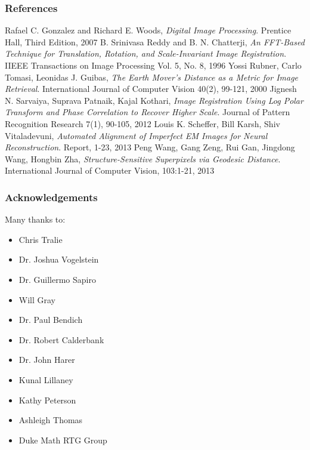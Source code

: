\documentclass{beamer}
\begin{document}
\begin{frame}
\frametitle{References}
\begin{thebibliography}{9}
\footnotesize
{}
	Rafael C. Gonzalez and Richard E. Woods,
	\emph{Digital Image Processing}.
	Prentice Hall, Third Edition, 2007
	B. Srinivasa Reddy and B. N. Chatterji,
	\emph{An FFT-Based Technique for Translation, Rotation, and Scale-Invariant Image Registration}.
	IIEEE Transactions on Image Processing Vol. 5, No. 8, 1996
	Yossi Rubner, Carlo Tomasi, Leonidas J. Guibas,
	\emph{The Earth Mover's Distance as a Metric for Image Retrieval}.
	International Journal of Computer Vision 40(2), 99-121, 2000
	Jignesh N. Sarvaiya, Suprava Patnaik, Kajal Kothari,
	\emph{Image Registration Using Log Polar Transform and Phase Correlation to Recover Higher Scale}.
	Journal of Pattern Recognition Research 7(1), 90-105, 2012
	Louis K. Scheffer, Bill Karsh, Shiv Vitaladevuni,
	\emph{Automated Alignment of Imperfect EM Images for Neural Reconstruction}.
	Report, 1-23, 2013
	Peng Wang, Gang Zeng, Rui Gan, Jingdong Wang, Hongbin Zha,
	\emph{Structure-Sensitive Superpixels via Geodesic Distance}.
	International Journal of Computer Vision, 103:1-21, 2013
\end{thebibliography} 
\end{frame}

\begin{frame}
\frametitle{Acknowledgements}
Many thanks to:
\begin{itemize}
\item Chris Tralie
\item Dr. Joshua Vogelstein
\item Dr. Guillermo Sapiro
\item Will Gray 
\item Dr. Paul Bendich 
\item Dr. Robert Calderbank
\item Dr. John Harer
\item Kunal Lillaney
\item Kathy Peterson 
\item Ashleigh Thomas 
\item Duke Math RTG Group 
\end{itemize}
\end{frame}
\end{document}
